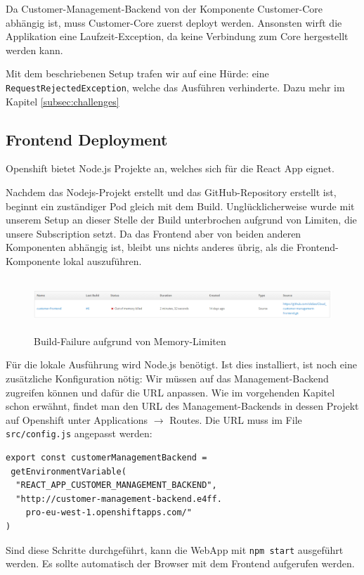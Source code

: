 \documentclass[12pt,a4paper]{article}
\begin{document}
Da Customer-Management-Backend von der Komponente Customer-Core abhängig ist, muss Customer-Core zuerst deployt werden. Ansonsten wirft die Applikation eine Laufzeit-Exception, da keine Verbindung zum Core hergestellt werden kann. 

Mit dem beschriebenen Setup trafen wir auf eine Hürde: eine \texttt{Request\-Rejected\-Exception}, welche das Ausführen verhinderte. Dazu mehr im Kapitel \ref{subsec:challenges}

\subsection{Frontend Deployment}\label{subsec:frontend}
Openshift bietet Node.js Projekte an, welches sich für die React App eignet. 

Nachdem das Nodejs-Projekt erstellt und das GitHub-Repository erstellt ist, beginnt ein zuständiger Pod gleich mit dem Build. Unglücklicherweise wurde mit unserem Setup an dieser Stelle der Build unterbrochen aufgrund von Limiten, die unsere Subscription setzt. Da das Frontend aber von beiden anderen Komponenten abhängig ist, bleibt uns nichts anderes übrig, als die Frontend-Komponente lokal auszuführen. 

\begin{figure}[h]
	\centering
	\includegraphics[width=1\linewidth,height=2cm]{img/os-frontend-build-fail}
	\caption{Build-Failure aufgrund von Memory-Limiten}
	\label{fig:os-frontend-build-fail}
\end{figure}

Für die lokale Ausführung wird Node.js benötigt. Ist dies installiert, ist noch eine zusätzliche Konfiguration nötig: Wir müssen auf das Management-Backend zugreifen können und dafür die URL anpassen. Wie im vorgehenden Kapitel schon erwähnt, findet man den URL des Management-Backends in dessen Projekt auf Openshift unter Applications $\rightarrow$ Routes. Die URL muss im File \texttt{src/config.js} angepasst werden:
\begin{lstlisting}[showstringspaces=false]
export const customerManagementBackend =
 getEnvironmentVariable(
  "REACT_APP_CUSTOMER_MANAGEMENT_BACKEND",
  "http://customer-management-backend.e4ff.
    pro-eu-west-1.openshiftapps.com/"
)
\end{lstlisting}
Sind diese Schritte durchgeführt, kann die WebApp mit \texttt{npm start} ausgeführt werden. Es sollte automatisch der Browser mit dem Frontend aufgerufen werden. 
\end{document}

